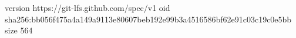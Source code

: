 version https://git-lfs.github.com/spec/v1
oid sha256:bb056f475a4a149a9113e80607beb192e99b3a4516586bf62e91c03c19c0e5bb
size 564
